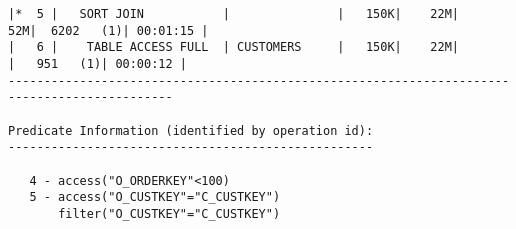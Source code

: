 \documentclass[11pt,a4paper,parskip=half]{scrartcl}
\begin{document}
\begin{lstlisting}
|*  5 |   SORT JOIN           |               |   150K|    22M|    52M|  6202   (1)| 00:01:15 |                                                                                                                                                                                                      
|   6 |    TABLE ACCESS FULL  | CUSTOMERS     |   150K|    22M|       |   951   (1)| 00:00:12 |                                                                                                                                                                                                      
---------------------------------------------------------------------------------------------                                                                                                                                                                                                     
                                                                                                                                                                                                                                                                                                             
Predicate Information (identified by operation id):                                                                                                                                                                                                                                                          
---------------------------------------------------                                                                                                                                                                                                                                                          
                                                                                                                                                                                                                                                                                                             
   4 - access("O_ORDERKEY"<100)                                                                                                                                                                                                                                                                              
   5 - access("O_CUSTKEY"="C_CUSTKEY")                                                                                                                                                                                                                                                                       
       filter("O_CUSTKEY"="C_CUSTKEY")                                                                                                                                                                                                                                                                       
\end{lstlisting}
\end{document}
